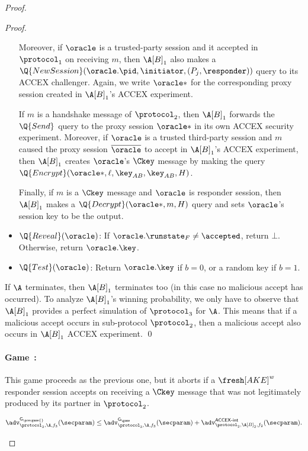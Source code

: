 \begin{proof}
\begin{proof}
\begin{itemize}
	\smallskip
	Moreover,
	if $\oracle$ is a trusted-party session and it accepted in $\protocol_1$ on receiving $m$,
	then $\A[B]_1$ also makes a $\Q{NewSession}(\oracle.\pid,\initiator, (P_j, \responder))$ query to its ACCEX challenger.
	Again, we write $\oracle*$ for the corresponding proxy session created in $\A[B]_1$'s ACCEX experiment.  
	

	\smallskip
	If $m$ is a handshake message of $\protocol_2$,
	then $\A[B]_1$ forwards the $\Q{Send}$ query to the proxy session $\oracle*$ in its own ACCEX security experiment.
	Moreover,
	if $\oracle$ is a trusted third-party session and $m$ caused the proxy session $\overline{\oracle}$ to accept in $\A[B]_1$'s ACCEX experiment,
	then $\A[B]_1$ creates $\oracle$'s $\Ckey$ message by making the query $\Q{Encrypt}(\oracle*, \ell, \key_{AB}, \key_{AB}, H)$.

	\smallskip
	Finally,
	if $m$ is a $\Ckey$ message and $\oracle$ is responder session,
	then $\A[B]_1$ makes a $\Q{Decrypt}(\oracle*, m, H)$ query and sets $\oracle$'s session key to be the output.


	\item $\Q{Reveal}(\oracle)$:
	If $\oracle.\runstate_F \neq \accepted$,
	return $\bot$.
	Otherwise, return $\oracle.\key$.

	\item $\Q{Test}(\oracle)$: 
	Return $\oracle.\key$ if $b=0$,
	or a random key if $b = 1$.
		
\end{itemize}
\normalsize

If $\A$ terminates,
then $\A[B]_1$ terminates too
(in this case no malicious accept has occurred).
To analyze $\A[B]_1$'s winning probability,
we only have to observe that $\A[B]_1$ provides a perfect simulation of $\protocol_3$ for $\A$.
This means that if a malicious accept occurs in sub-protocol $\protocol_2$,
then a malicious accept also occurs in $\A[B]_1$ ACCEX experiment.
\qed
\end{proof}

\newgame
\paragraph{Game~\game:}\label{proof:3P-KD:game_hop:int_in_ACCE}
This game proceeds as the previous one, 
but it aborts if a $\fresh[AKE]^w$ responder session accepts on receiving a $\Ckey$ message that was not legitimately produced by its partner in $\protocol_2$.
\begin{lemma}\label{lemma:3P-AKE-:game:ACCEX-int}
$
	\adv_{\protocol_3,\A,f_3}^{\mathsf{G_{\prevgame{}}}}(\secparam) 
	\leq \adv_{\protocol_3,\A,f_3}^{\mathsf{G_\game}}(\secparam) 
	+ \adv_{\protocol_2,\A[B]_2,f_2}^{\operatorname{\mathsf{ACCEX-int}}}(\secparam)  .
$
\end{lemma}


\end{proof}
